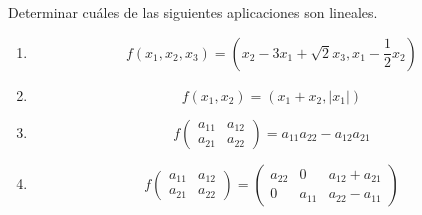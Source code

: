 \begin{enunciado}{\ejercicio}
  Determinar cuáles de las siguientes aplicaciones son lineales.
  \begin{enumerate}[label=(\alph*)]
  \item \[f(x_1, x_2, x_3) = (x_2 - 3x_1 + \sqrt{2}x_3, x_1 - \frac{1}{2} x_2)
    \]
  \item \[f(x_1, x_2) = (x_1 + x_2, |x_1|)\]

  \item \[f \begin{pmatrix} a_{11} & a_{12} \\ a_{21} & a_{22} \end{pmatrix} =
  a_{11} a_{22} - a_{12} a_{21}
  \]
  \item \[f \begin{pmatrix} a_{11} & a_{12} \\ a_{21} & a_{22} \end{pmatrix} =
  \begin{pmatrix} a_{22} & 0 & a_{12} + a_{21} \\ 0 & a_{11} & a_{22} - a_{11} \end{pmatrix}
  \]

  \end{enumerate}
\end{enunciado}

